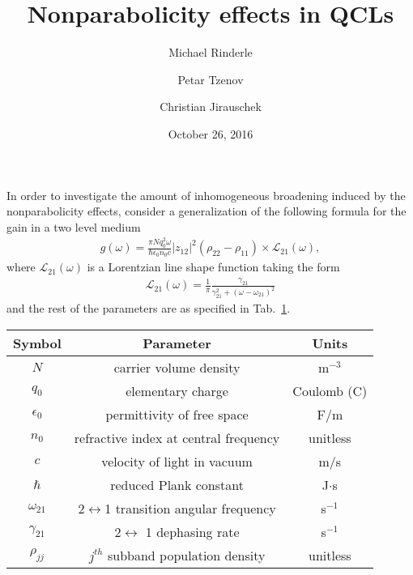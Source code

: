 \documentclass[preprint,secnumarabic,amssymb, nobibnotes, aip, prd]{revtex4-1}
\begin{document}
\title{Nonparabolicity effects in QCLs}%

\author{Michael Rinderle}%
\author{Petar Tzenov}%
\author{Christian Jirauschek}%
\date{October 26, 2016}%
\maketitle
In order to investigate the amount of inhomogeneous broadening induced by the nonparabolicity effects, consider a generalization of the following formula for the gain in a two level medium \cite{jirauschek2014modeling}
\begin{align}
\label{eq:twolevelgain}
g(\omega) = \frac{\pi Nq_0^2\omega}{\hbar\epsilon_0n_0c}|z_{12}|^2(\rho_{22}-\rho_{11})\times\mathcal{L}_{21}(\omega),
\end{align}
where $\mathcal{L}_{21}(\omega)$ is a Lorentzian line shape function taking the form
\begin{align}
\mathcal{L}_{21}(\omega) = \frac{1}{\pi}\frac{\gamma_{21}}{\gamma_{21}^2+(\omega-\omega_{21})^2}
\end{align}
and the rest of the parameters are as specified in Tab.~\ref{tab:table01}.

\begin{table}[h!]
	\centering
	\footnotesize
	\begin{tabular}{ | c | c c | }\hline
		\textbf{Symbol} & \textbf{Parameter} & \textbf{Units} \\\hline
		$N$ & carrier volume density & m$^{-3}$ \\
		$q_0$ & elementary charge & Coulomb (C) \\
		$\epsilon_0$ & permittivity of free space & F/m \\
		$n_0$ & refractive index at central frequency & unitless \\
		$c$ & velocity of light in vacuum& m/s \\
		$\hbar$ & reduced Plank constant & J$\cdot$s \\
		$\omega_{21}$ & 2$\leftrightarrow$1 transition angular frequency & s$^{-1}$ \\
		$\gamma_{21}$ & 2$\leftrightarrow$ 1 dephasing rate & s$^{-1}$ \\
		$\rho_{jj}$ & $j^{th}$ subband population density & unitless \\
		\hline
	\end{tabular} \quad 
	\label{tab:table01}	
\end{table}
\end{document}
